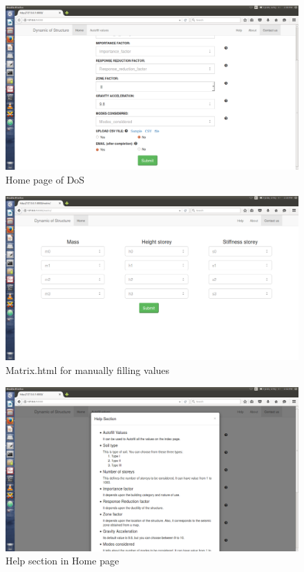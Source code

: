 \begin{figure}[H]
\centering \includegraphics[scale=0.32]{images/output/1.png}
\caption{Home page of DoS}
\end{figure}
\begin{figure}[H]
\centering \includegraphics[scale=0.32]{images/output/2.png}
\caption{Matrix.html for manually filling values}
\end{figure}
\newpage
\begin{figure}[H]
\centering \includegraphics[scale=0.31]{images/output/3.png}
\caption{Help section in Home page}
\end{figure}
